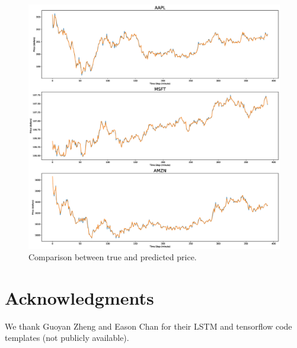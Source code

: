 \documentclass{article}
\begin{document}
\begin{figure}
  \includegraphics[width=\linewidth]{Figures/PredTruth_2.eps}
  \caption{Comparison between true and predicted price.}
  \label{truth-pred-plot}
\end{figure}

\section*{Acknowledgments} 
We thank Guoyan Zheng and Eason Chan for their LSTM and tensorflow code templates (not publicly available).



\end{document}
